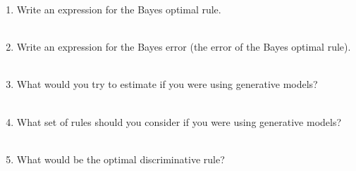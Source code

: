 \documentclass[10pt]{article}
\begin{document}
   \begin{enumerate}
   \item Write an expression for the Bayes optimal rule.
     \\~\\
     \underline{\hspace{6in}}
   \item Write an expression for the Bayes error (the error of the
     Bayes optimal rule).
     \\~\\
     \underline{\hspace{6in}}
   \item What would you try to estimate if you were using 
     generative models?
     \\~\\
     \underline{\hspace{6in}}
   \item What set of rules should you consider if you were using
     generative models?
     \\~\\
     \underline{\hspace{6in}}
   \item What would be the optimal discriminative rule?
     \\~\\
     \underline{\hspace{6in}}
   \end{enumerate}
\end{document}
